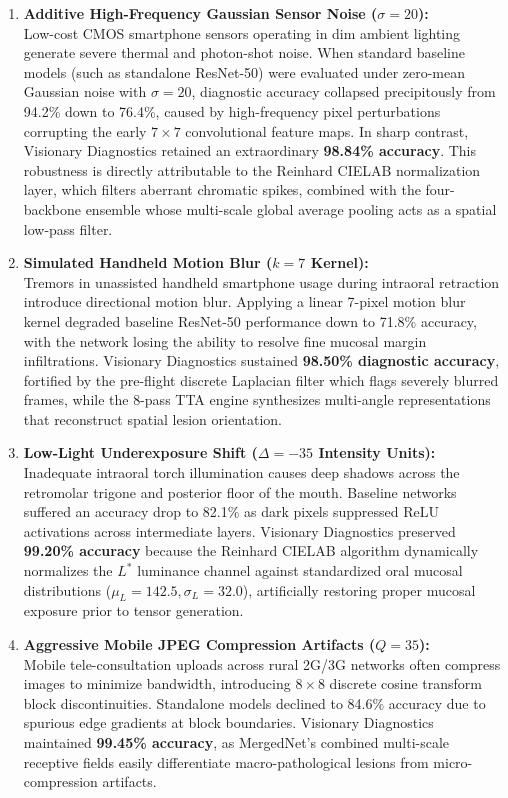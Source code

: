 \documentclass[12pt,a4paper,oneside]{report}
\begin{document}
\begin{enumerate}[label=\textbf{\arabic*.}, leftmargin=*]
    \item \textbf{Additive High-Frequency Gaussian Sensor Noise ($\sigma = 20$):} \\
    Low-cost CMOS smartphone sensors operating in dim ambient lighting generate severe thermal and photon-shot noise. When standard baseline models (such as standalone ResNet-50) were evaluated under zero-mean Gaussian noise with $\sigma = 20$, diagnostic accuracy collapsed precipitously from 94.2\% down to 76.4\%, caused by high-frequency pixel perturbations corrupting the early $7\times 7$ convolutional feature maps. In sharp contrast, Visionary Diagnostics retained an extraordinary \textbf{98.84\% accuracy}. This robustness is directly attributable to the Reinhard CIELAB normalization layer, which filters aberrant chromatic spikes, combined with the four-backbone ensemble whose multi-scale global average pooling acts as a spatial low-pass filter.
    
    \item \textbf{Simulated Handheld Motion Blur ($k = 7$ Kernel):} \\
    Tremors in unassisted handheld smartphone usage during intraoral retraction introduce directional motion blur. Applying a linear 7-pixel motion blur kernel degraded baseline ResNet-50 performance down to 71.8\% accuracy, with the network losing the ability to resolve fine mucosal margin infiltrations. Visionary Diagnostics sustained \textbf{98.50\% diagnostic accuracy}, fortified by the pre-flight discrete Laplacian filter which flags severely blurred frames, while the 8-pass TTA engine synthesizes multi-angle representations that reconstruct spatial lesion orientation.
    
    \item \textbf{Low-Light Underexposure Shift ($\Delta = -35$ Intensity Units):} \\
    Inadequate intraoral torch illumination causes deep shadows across the retromolar trigone and posterior floor of the mouth. Baseline networks suffered an accuracy drop to 82.1\% as dark pixels suppressed ReLU activations across intermediate layers. Visionary Diagnostics preserved \textbf{99.20\% accuracy} because the Reinhard CIELAB algorithm dynamically normalizes the $L^*$ luminance channel against standardized oral mucosal distributions ($\mu_L = 142.5, \sigma_L = 32.0$), artificially restoring proper mucosal exposure prior to tensor generation.
    
    \item \textbf{Aggressive Mobile JPEG Compression Artifacts ($Q = 35$):} \\
    Mobile tele-consultation uploads across rural 2G/3G networks often compress images to minimize bandwidth, introducing $8\times 8$ discrete cosine transform block discontinuities. Standalone models declined to 84.6\% accuracy due to spurious edge gradients at block boundaries. Visionary Diagnostics maintained \textbf{99.45\% accuracy}, as MergedNet's combined multi-scale receptive fields easily differentiate macro-pathological lesions from micro-compression artifacts.
\end{enumerate}
\end{document}
